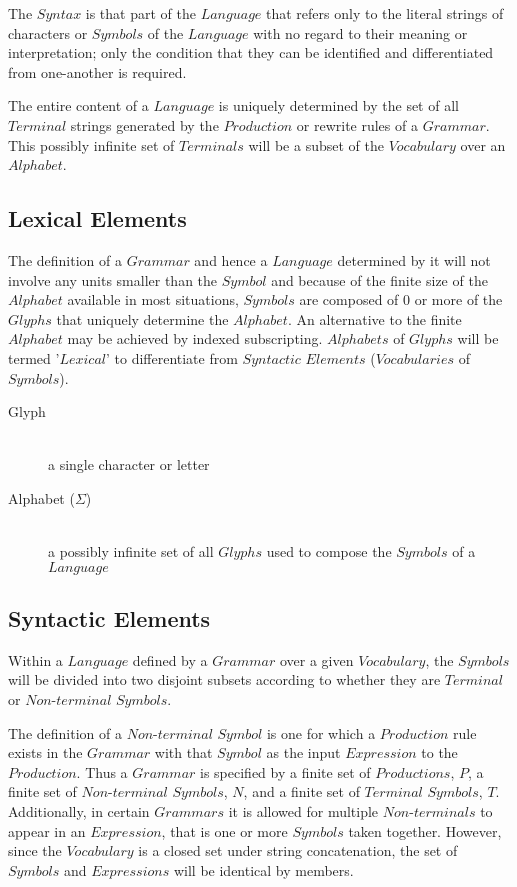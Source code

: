 \documentclass{article}
\begin{document}
The $Syntax$ is that part of the $Language$ that refers only to the
literal strings of characters or $Symbols$ of the $Language$ with no
regard to their meaning or interpretation; only the condition that
they can be identified and differentiated from one-another is
required.

The entire content of a $Language$ is uniquely determined by the set
of all $Terminal$ strings generated by the $Production$ or rewrite
rules of a $Grammar$. This possibly infinite set of $Terminals$ will
be a subset of the $Vocabulary$ over an $Alphabet$.

\subsection{Lexical Elements}

The definition of a $Grammar$ and hence a $Language$ determined by it
will not involve any units smaller than the $Symbol$ and because of
the finite size of the $Alphabet$ available in most situations,
$Symbols$ are composed of 0 or more of the $Glyphs$ that uniquely
determine the $Alphabet$. An alternative to the finite $Alphabet$ may
be achieved by indexed subscripting. $Alphabets$ of $Glyphs$ will be
termed '$Lexical$' to differentiate from $Syntactic$ $Elements$
($Vocabularies$ of $Symbols$).

    \begin{description}

    \item[Glyph] \hfill \\
    a single character or letter

    \item[Alphabet ($\Sigma$)] \hfill \\
    a possibly infinite set of all $Glyphs$ used to compose the
    $Symbols$ of a $Language$

    \end{description}

\subsection{Syntactic Elements}

Within a $Language$ defined by a $Grammar$ over a given $Vocabulary$,
the $Symbols$ will be divided into two disjoint subsets according to
whether they are $Terminal$ or $Non$-$terminal$ $Symbols$.

The definition of a $Non$-$terminal$ $Symbol$ is one for which a
$Production$ rule exists in the $Grammar$ with that $Symbol$ as the
input $Expression$ to the $Production$. Thus a $Grammar$ is specified
by a finite set of $Productions$, $P$, a finite set of
$Non$-$terminal$ $Symbols$, $N$, and a finite set of $Terminal$
$Symbols$, $T$. Additionally, in certain $Grammars$ it is allowed for
multiple $Non$-$terminals$ to appear in an $Expression$, that is one
or more $Symbols$ taken together. However, since the $Vocabulary$ is a
closed set under string concatenation, the set of $Symbols$ and
$Expressions$ will be identical by members.
\end{document}
